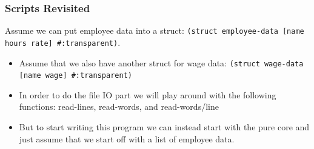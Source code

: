 \documentclass{beamer}
\begin{document}
\begin{frame}
  \frametitle{Scripts Revisited}
  Assume we can put employee data into a struct:
  \texttt{(struct employee-data [name hours rate] #:transparent)}.
  \begin{itemize}
  \item<2-> Assume that we also have another struct for wage data:
    \texttt{(struct wage-data [name wage] #:transparent)}
  \item<3-> In order to do the file IO part we will play around with the following functions: read-lines, read-words, and read-words/line
  \item<4-> But to start writing this program we can instead start with the pure core and just assume that we start off with a list of employee data.
  \end{itemize}
\end{frame}
\end{document}
